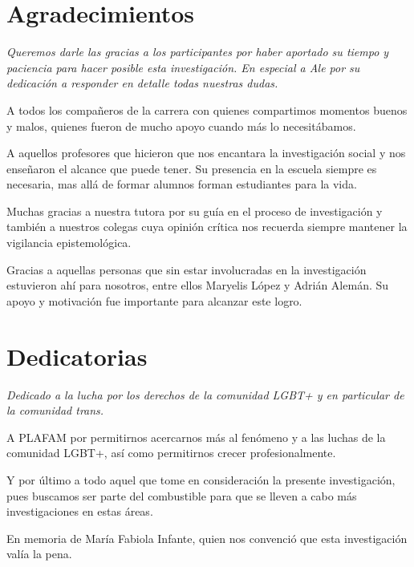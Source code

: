 \chapter{Agradecimientos}

 \begin{flushleft}
    \itshape
Queremos darle las gracias a los participantes por haber aportado su tiempo
y paciencia para hacer posible esta investigación. En especial a Ale por su
dedicación a responder en detalle todas nuestras dudas.

A todos los compañeros de la carrera con quienes compartimos momentos buenos y
malos, quienes fueron de mucho apoyo cuando más lo necesitábamos.

A aquellos profesores que hicieron que nos encantara la investigación social y
nos enseñaron el alcance que puede tener. Su presencia en la escuela siempre es
necesaria, mas allá de formar alumnos forman estudiantes para la vida.

Muchas gracias a nuestra tutora por su guía en el
proceso de investigación y también a nuestros colegas cuya opinión crítica nos
recuerda siempre mantener la vigilancia epistemológica.

Gracias a aquellas personas que sin estar involucradas en la investigación
estuvieron ahí para nosotros, entre ellos Maryelis López y Adrián Alemán. Su
apoyo y motivación fue importante para alcanzar este logro.

\end{flushleft}

\chapter{Dedicatorias}

\begin{flushleft}
\itshape
Dedicado a la lucha por los derechos de la comunidad LGBT+ y en particular de la
comunidad trans.

A PLAFAM por permitirnos acercarnos más al fenómeno y a las luchas de la
comunidad LGBT+, así como permitirnos crecer profesionalmente.

Y por último a todo aquel que tome en consideración la presente investigación,
pues buscamos ser parte del combustible para que se lleven a cabo más
investigaciones en estas áreas.

En memoria de María Fabiola Infante, quien nos convenció
que esta investigación valía la pena.

\end{flushleft}

